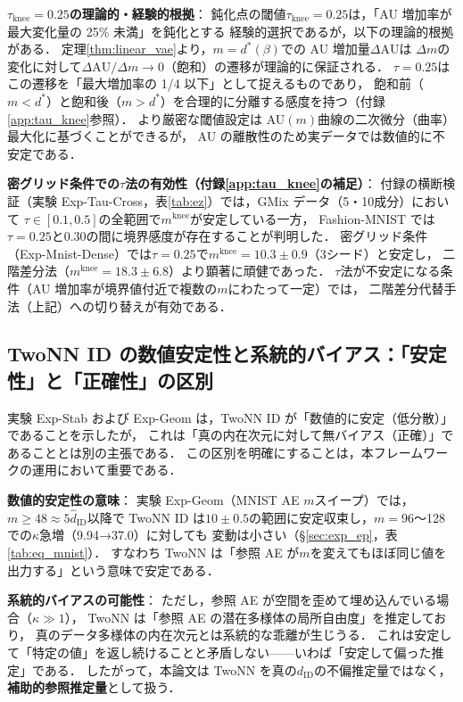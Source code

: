 \documentclass[11pt,a4paper]{jsarticle}
\newcommand{\mknee}{m^{\mathrm{knee}}}
\begin{document}
\textbf{$\tau_{\mathrm{knee}} = 0.25$の理論的・経験的根拠}：
鈍化点の閾値$\tau_{\mathrm{knee}} = 0.25$は，「AU 増加率が最大変化量の 25\% 未満」を鈍化とする
経験的選択であるが，以下の理論的根拠がある．
定理\ref{thm:linear_vae}より，$m = d^*(\beta)$での AU 増加量$\Delta\mathrm{AU}$は
$\Delta m$の変化に対して$\Delta\mathrm{AU}/\Delta m \to 0$（飽和）の遷移が理論的に保証される．
$\tau = 0.25$はこの遷移を「最大増加率の 1/4 以下」として捉えるものであり，
飽和前（$m < d^*$）と飽和後（$m > d^*$）を合理的に分離する感度を持つ（付録\ref{app:tau_knee}参照）．
より厳密な閾値設定は AU$(m)$曲線の二次微分（曲率）最大化に基づくことができるが，
AU の離散性のため実データでは数値的に不安定である．

\textbf{密グリッド条件での$\tau$法の有効性（付録\ref{app:tau_knee}の補足）}：
付録の横断検証（実験 Exp-Tau-Cross，表\ref{tab:ez}）では，GMix データ（5・10成分）において
$\tau \in [0.1, 0.5]$の全範囲で$\mknee$が安定している一方，
Fashion-MNIST では$\tau = 0.25$と$0.30$の間に境界感度が存在することが判明した．
密グリッド条件（Exp-Mnist-Dense）では$\tau = 0.25$で$\mknee = 10.3 \pm 0.9$（3シード）と安定し，
二階差分法（$\mknee = 18.3 \pm 6.8$）より顕著に頑健であった．
$\tau$法が不安定になる条件（AU 増加率が境界値付近で複数の$m$にわたって一定）では，
二階差分代替手法（上記）への切り替えが有効である．

\subsection{TwoNN ID の数値安定性と系統的バイアス：「安定性」と「正確性」の区別}\label{sec:disc_twonn_bias}

実験 Exp-Stab および Exp-Geom は，TwoNN ID が「数値的に安定（低分散）」であることを示したが，
これは「真の内在次元に対して無バイアス（正確）」であることとは別の主張である．
この区別を明確にすることは，本フレームワークの運用において重要である．

\textbf{数値的安定性の意味}：
実験 Exp-Geom（MNIST AE $m$スイープ）では，$m \geq 48 \approx 5\hat{d}_\mathrm{ID}$以降で
TwoNN ID は$10 \pm 0.5$の範囲に安定収束し，$m = 96$〜128 での$\kappa$急増（9.94→37.0）に対しても
変動は小さい（§\ref{sec:exp_ep}，表\ref{tab:eq_mnist}）．
すなわち TwoNN は「参照 AE が$m$を変えてもほぼ同じ値を出力する」という意味で安定である．

\textbf{系統的バイアスの可能性}：
ただし，参照 AE が空間を歪めて埋め込んでいる場合（$\kappa \gg 1$），
TwoNN は「参照 AE の潜在多様体の局所自由度」を推定しており，
真のデータ多様体の内在次元とは系統的な乖離が生じうる．
これは安定して「特定の値」を返し続けることと矛盾しない——いわば「安定して偏った推定」である．
したがって，本論文は TwoNN を真の$d_\mathrm{ID}$の不偏推定量ではなく，
\textbf{補助的参照推定量}として扱う．
\end{document}
